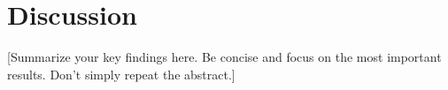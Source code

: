 
\section{Discussion}



[Summarize your key findings here. Be concise and focus on the most important results.
Don't simply repeat the abstract.]



